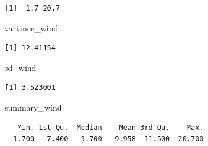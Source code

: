 \documentclass[
  letterpaper,
  DIV=11,
  numbers=noendperiod]{scrreprt}
\newenvironment{Shaded}{\begin{snugshade}}{\end{snugshade}}
\newcommand{\CommentTok}[1]{\textcolor[rgb]{0.37,0.37,0.37}{#1}}
\newcommand{\FunctionTok}[1]{\textcolor[rgb]{0.28,0.35,0.67}{#1}}
\newcommand{\NormalTok}[1]{\textcolor[rgb]{0.00,0.23,0.31}{#1}}
\newcommand{\OtherTok}[1]{\textcolor[rgb]{0.00,0.23,0.31}{#1}}
\newcommand{\SpecialCharTok}[1]{\textcolor[rgb]{0.37,0.37,0.37}{#1}}
\begin{document}
\begin{Shaded}
\end{Shaded}

\begin{verbatim}
[1]  1.7 20.7
\end{verbatim}

\begin{Shaded}
\begin{Highlighting}[]
\NormalTok{variance\_wind}
\end{Highlighting}
\end{Shaded}

\begin{verbatim}
[1] 12.41154
\end{verbatim}

\begin{Shaded}
\begin{Highlighting}[]
\NormalTok{sd\_wind}
\end{Highlighting}
\end{Shaded}

\begin{verbatim}
[1] 3.523001
\end{verbatim}

\begin{Shaded}
\begin{Highlighting}[]
\NormalTok{summary\_wind}
\end{Highlighting}
\end{Shaded}

\begin{verbatim}
   Min. 1st Qu.  Median    Mean 3rd Qu.    Max. 
  1.700   7.400   9.700   9.958  11.500  20.700 
\end{verbatim}
\end{document}
